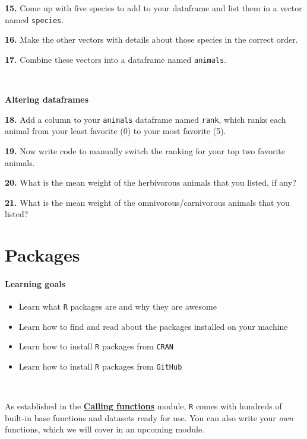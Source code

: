 \documentclass[
]{book}
\providecommand{\tightlist}{%
  \setlength{\itemsep}{0pt}\setlength{\parskip}{0pt}}
\begin{document}
\textbf{15.} Come up with five species to add to your dataframe and list them in a vector named \texttt{species}.

\textbf{16.} Make the other vectors with details about those species in the correct order.

\textbf{17.} Combine these vectors into a dataframe named \texttt{animals}.

~

\textbf{Altering dataframes}

\textbf{18.} Add a column to your \texttt{animals} dataframe named \texttt{rank}, which ranks each animal from your least favorite (0) to your most favorite (5).

\textbf{19.} Now write code to manually switch the ranking for your top two favorite animals.

\textbf{20.} What is the mean weight of the herbivorous animals that you listed, if any?

\textbf{21.} What is the mean weight of the omnivorous/carnivorous animals that you listed?

\hypertarget{packages}{%
\chapter{Packages}\label{packages}}

\hypertarget{learning-goals-3}{%
\subsubsection*{Learning goals}\label{learning-goals-3}}

\begin{itemize}
\tightlist
\item
  Learn what \texttt{R} packages are and why they are awesome
\item
  Learn how to find and read about the packages installed on your machine
\item
  Learn how to install \texttt{R} packages from \texttt{CRAN}
\item
  Learn how to install \texttt{R} packages from \texttt{GitHub}
\end{itemize}

~

As established in the \protect\hyperlink{calling_functions}{\textbf{Calling functions}} module, \texttt{R} comes with hundreds of built-in base functions and datasets ready for use. You can also write your \emph{own} functions, which we will cover in an upcoming module.
\end{document}
